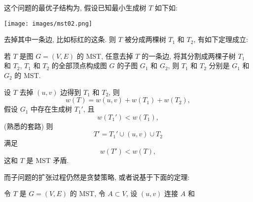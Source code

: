 \documentclass[a4paper]{ctexart}
\newcommand{\hl}[1]
{\noindent {\bf {#1}}}
\theoremstyle{definition}
\theoremstyle{definition}
\begin{document}
这个问题的最优子结构为, 假设已知最小生成树 $T$ 如下如: 
\begin{center}
  \texttt{[image: images/mst02.png]}
  
\end{center}

去掉其中一条边, 比如标红的这条. 则 $T$ 被分成两棵树 $T_1$ 和 $T_2$, 有如下定理成立:

\hl{定理} 若 $T$ 是图 $G = (V, E)$ 的 MST, 任意去掉 $T$ 的一条边, 将其分割成两棵子树 $T_1$ 和 $T_2$,  
$T_1$ 和 $T_2$ 的全部顶点构成图 $G$ 的子图 $G_1$ 和 $G_2$, 则 $T_1$ 和 $T_2$ 分别是 $G_1$ 和 $G_2$ 的 MST.

\hl{证明} 设 $T$ 去掉 $(u, v)$ 边得到 $T_1$ 和 $T_2$, 则
$$
w(T) = w(u, v) + w(T_1) + w(T_2),
$$
假设 $G_1$ 中存在生成树 $T_1'$, 且 
$$
w(T_1') < w(T_1),
$$
(熟悉的套路) 则
$$
T' = T_1' \cup (u, v) \cup T_2
$$
满足
$$
w(T') < w(T),
$$
这和 $T$ 是 MST 矛盾.

而子问题的扩张过程仍然是贪婪策略, 或者说基于下面的定理:

\hl{定理} 令 $T$ 是 $G = (V, E)$ 的 MST, 令 $A \subset V$, 设 $(u, v)$ 连接 $A$ 和 



\end{document}
